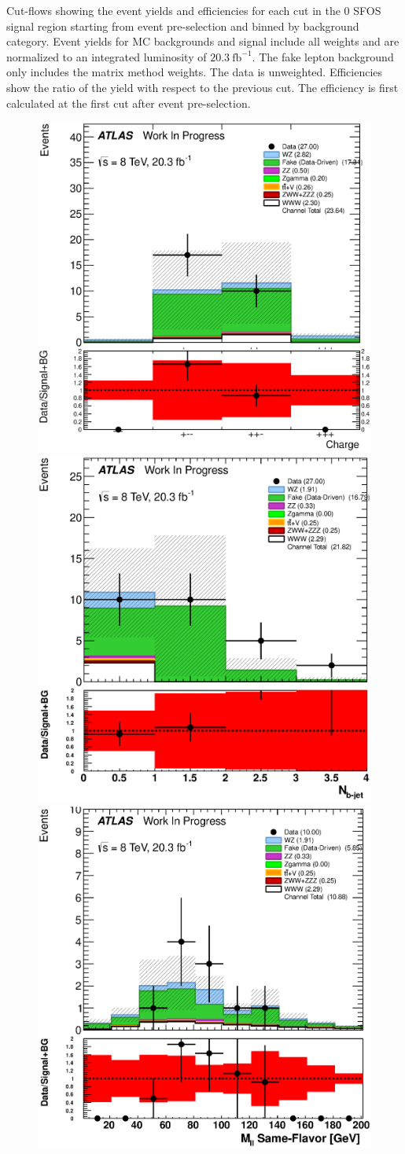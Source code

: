\begin{table}[ht!]
\centering
\small


\caption{Cut-flows showing the event yields and efficiencies for each cut in the 0 SFOS signal region
starting from event pre-selection and binned by background category. 
Event yields for MC backgrounds and signal include all weights and are normalized to an integrated luminosity of $20.3~\mathrm{fb}^{-1}$.  
The fake lepton background only includes the matrix method weights.  The data is unweighted.
Efficiencies show the ratio of the yield with respect
to the previous cut.  The efficiency is first calculated at the first cut after event pre-selection.  }
\label{tab:cutflow_weighted_0sfos_bg}
\end{table}

\begin{figure}[ht!]
\centering
\includegraphics[width=0.3\columnwidth]{figures/appendix_signal_selection/Nov24Update_FakeSys_KFacSys_LinearY_Rebin/output/jobs/MxM/DataFull_Rates_May13_FakeRatesExactly2Loose_MuonMxMBJetGt0_ElBJetGt0SubtractPC_MxM/PreselectionNov23_15_0SFOS_physics/weight_all/eps/TotalCharge_histratio.eps}
\includegraphics[width=0.3\columnwidth]{figures/appendix_signal_selection/Nov24Update_FakeSys_KFacSys_LinearY_Rebin/output/jobs/MxM/DataFull_Rates_May13_FakeRatesExactly2Loose_MuonMxMBJetGt0_ElBJetGt0SubtractPC_MxM/PreselectionNov23_15_0SFOS_ChargeAbs1_physics/weight_all/eps/NBTaggedJets_histratio.eps}
\includegraphics[width=0.3\columnwidth]{figures/appendix_signal_selection/Nov24Update_FakeSys_KFacSys_LinearY_Rebin/output/jobs/MxM/DataFull_Rates_May13_FakeRatesExactly2Loose_MuonMxMBJetGt0_ElBJetGt0SubtractPC_MxM/PreselectionNov23_15_0SFOS_ChargeAbs1_BVeto85_physics/weight_all/eps/InvariantMassSF_histratio.eps}

\end{figure}
